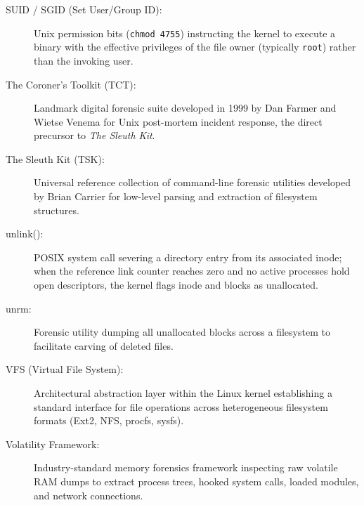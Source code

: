 \begin{description}
    \item[SUID / SGID (Set User/Group ID):] Unix permission bits (\texttt{chmod 4755}) instructing the kernel to execute a binary with the effective privileges of the file owner (typically \texttt{root}) rather than the invoking user.

    \item[The Coroner's Toolkit (TCT):] Landmark digital forensic suite developed in 1999 by Dan Farmer and Wietse Venema for Unix post-mortem incident response, the direct precursor to \textit{The Sleuth Kit}.

    \item[The Sleuth Kit (TSK):] Universal reference collection of command-line forensic utilities developed by Brian Carrier for low-level parsing and extraction of filesystem structures.

    \item[unlink():] POSIX system call severing a directory entry from its associated inode; when the reference link counter reaches zero and no active processes hold open descriptors, the kernel flags inode and blocks as unallocated.

    \item[unrm:] Forensic utility dumping all unallocated blocks across a filesystem to facilitate carving of deleted files.

    \item[VFS (Virtual File System):] Architectural abstraction layer within the Linux kernel establishing a standard interface for file operations across heterogeneous filesystem formats (Ext2, NFS, procfs, sysfs).

    \item[Volatility Framework:] Industry-standard memory forensics framework inspecting raw volatile RAM dumps to extract process trees, hooked system calls, loaded modules, and network connections.
\end{description}
